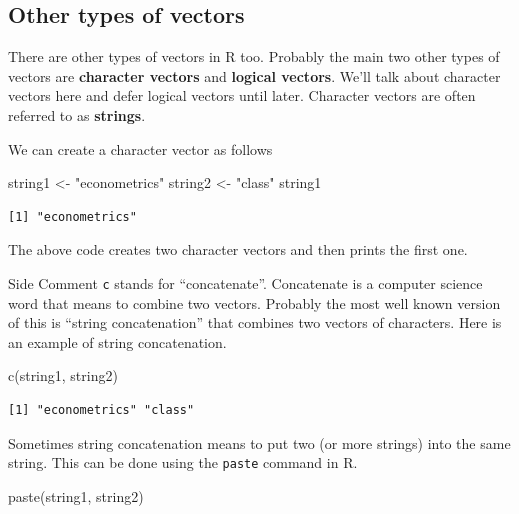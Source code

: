 \documentclass[
  letterpaper,
  DIV=11,
  numbers=noendperiod]{scrreprt}
\newenvironment{Shaded}{\begin{snugshade}}{\end{snugshade}}
\newcommand{\FunctionTok}[1]{\textcolor[rgb]{0.28,0.35,0.67}{#1}}
\newcommand{\NormalTok}[1]{\textcolor[rgb]{0.00,0.23,0.31}{#1}}
\newcommand{\OtherTok}[1]{\textcolor[rgb]{0.00,0.23,0.31}{#1}}
\newcommand{\StringTok}[1]{\textcolor[rgb]{0.13,0.47,0.30}{#1}}
\begin{document}
\subsection{Other types of vectors}\label{other-types-of-vectors}

There are other types of vectors in R too. Probably the main two other
types of vectors are \textbf{character vectors} and \textbf{logical
vectors}. We'll talk about character vectors here and defer logical
vectors until later. Character vectors are often referred to as
\textbf{strings}.

We can create a character vector as follows

\begin{Shaded}
\begin{Highlighting}[]
\NormalTok{string1 }\OtherTok{\textless{}{-}} \StringTok{"econometrics"}
\NormalTok{string2 }\OtherTok{\textless{}{-}} \StringTok{"class"}
\NormalTok{string1}
\end{Highlighting}
\end{Shaded}

\begin{verbatim}
[1] "econometrics"
\end{verbatim}

The above code creates two character vectors and then prints the first
one.

{Side Comment} \texttt{c} stands for ``concatenate''. Concatenate is a
computer science word that means to combine two vectors. Probably the
most well known version of this is ``string concatenation'' that
combines two vectors of characters. Here is an example of string
concatenation.

\begin{Shaded}
\begin{Highlighting}[]
\FunctionTok{c}\NormalTok{(string1, string2)}
\end{Highlighting}
\end{Shaded}

\begin{verbatim}
[1] "econometrics" "class"       
\end{verbatim}

Sometimes string concatenation means to put two (or more strings) into
the same string. This can be done using the \texttt{paste} command in R.

\begin{Shaded}
\begin{Highlighting}[]
\FunctionTok{paste}\NormalTok{(string1, string2)}
\end{Highlighting}
\end{Shaded}
\end{document}

